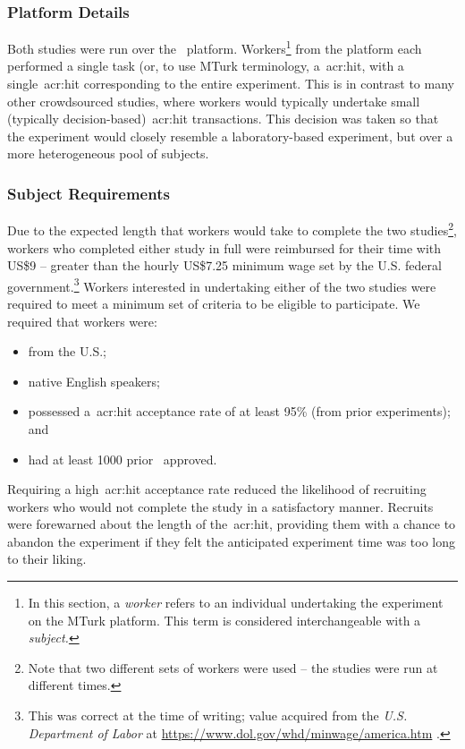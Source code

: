 \subsubsection{Platform Details}\label{sec:methodology:user:crowdsourcing:platform}
Both studies were run over the~ platform. Workers\footnote{In this section, a \emph{worker} refers to an individual undertaking the experiment on the MTurk platform. This term is considered interchangeable with a \emph{subject.}} from the platform each performed a single task (or, to use MTurk terminology, a~\gls{acr:hit}, with a single~\gls{acr:hit} corresponding to the entire experiment. This is in contrast to many other crowdsourced studies, where workers would typically undertake small (typically decision-based)~\gls{acr:hit} transactions. This decision was taken so that the experiment would closely resemble a laboratory-based experiment, but over a more heterogeneous pool of subjects.

\subsubsection{Subject Requirements}\label{sec:methodology:user:crowdsourcing:subjects}
Due to the expected length that workers would take to complete the two studies\footnote{Note that two different sets of workers were used -- the studies were run at different times.}, workers who completed either study in full were reimbursed for their time with US\$9 -- greater than the hourly US\$7.25 minimum wage set by the U.S. federal government.\footnote{This was correct at the time of writing; value acquired from the \emph{U.S. Department of Labor} at \url{https://www.dol.gov/whd/minwage/america.htm} .} Workers interested in undertaking either of the two studies were required to meet a minimum set of criteria to be eligible to participate. We required that workers were:

\begin{itemize}
    \item{from the U.S.;}
    \item{native English speakers;}
    \item{possessed a~\gls{acr:hit} acceptance rate of at least 95\% (from prior experiments); and}
    \item{had at least 1000 prior~ approved.}
\end{itemize}

Requiring a high~\gls{acr:hit} acceptance rate reduced the likelihood of recruiting workers who would not complete the study in a satisfactory manner. Recruits were forewarned about the length of the~\gls{acr:hit}, providing them with a chance to abandon the experiment if they felt the anticipated experiment time was too long to their liking.

